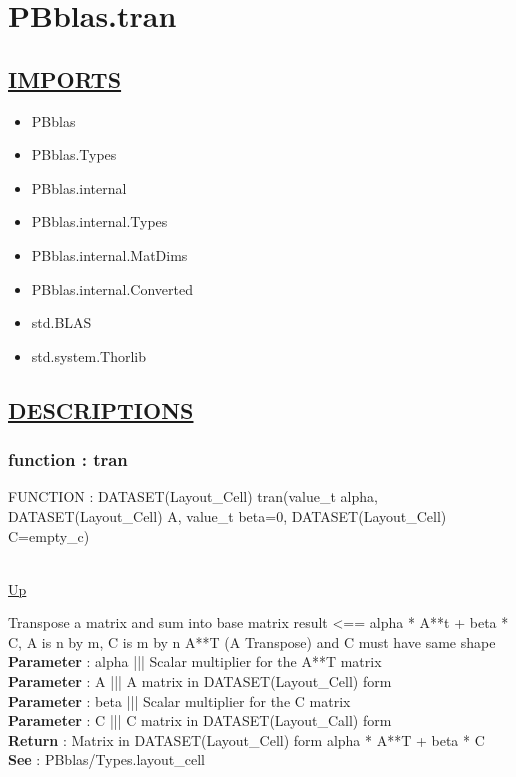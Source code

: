 \chapter*{PBblas.tran}
\hypertarget{PBblas.tran}{}

\section*{\underline{IMPORTS}}
\begin{itemize}
\item PBblas
\item PBblas.Types
\item PBblas.internal
\item PBblas.internal.Types
\item PBblas.internal.MatDims
\item PBblas.internal.Converted
\item std.BLAS
\item std.system.Thorlib
\end{itemize}

\section*{\underline{DESCRIPTIONS}}
\subsection*{function : tran}
\hypertarget{ecldoc:pbblas.tran}{FUNCTION : DATASET(Layout\_Cell) tran(value\_t alpha, DATASET(Layout\_Cell) A, value\_t beta=0, DATASET(Layout\_Cell) C=empty\_c)} \\
\hyperlink{ecldoc:}{Up} \\
\par
Transpose a matrix and sum into base matrix result <== alpha * A**t + beta * C, A is n by m, C is m by n A**T (A Transpose) and C must have same shape \\
\textbf{Parameter} : alpha ||| Scalar multiplier for the A**T matrix \\
\textbf{Parameter} : A ||| A matrix in DATASET(Layout\_Cell) form \\
\textbf{Parameter} : beta ||| Scalar multiplier for the C matrix \\
\textbf{Parameter} : C ||| C matrix in DATASET(Layout\_Call) form \\
\textbf{Return} : Matrix in DATASET(Layout\_Cell) form alpha * A**T + beta * C \\
\textbf{See} : PBblas/Types.layout\_cell \\
